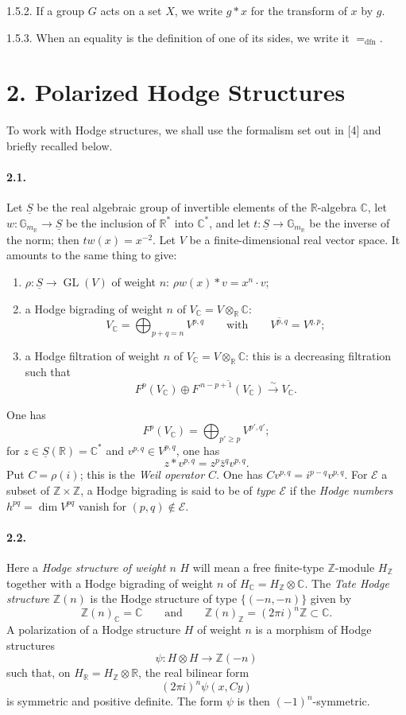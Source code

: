 \documentclass[10pt,leqno]{article}
\newcommand{\C}{\mathbb{C}}
\newcommand{\R}{\mathbb{R}}
\newcommand{\Z}{\mathbb{Z}}
\newcommand{\GL}{\operatorname{GL}}
\newcommand{\dfn}{\mathrm{dfn}}
\newcommand{\iso}{\xrightarrow{\sim}}
\begin{document}
1.5.2. If a group $G$ acts on a set $X$, we write $g*x$ for the transform of $x$ by $g$.

1.5.3. When an equality is the definition of one of its sides, we write it $=_{\dfn}$.

\section*{2. Polarized Hodge Structures}

To work with Hodge structures, we shall use the formalism set out in [4] and briefly recalled below.

\paragraph{2.1.} Let $\underline S$ be the real algebraic group of invertible elements of the $\R$-algebra $\C$, let $w:\mathbb G_{m_{\R}}\to\underline S$ be the inclusion of $\R^*$ into $\C^*$, and let $t:\underline S\to\mathbb G_{m_{\R}}$ be the inverse of the norm; then $t w(x)=x^{-2}$. Let $V$ be a finite-dimensional real vector space. It amounts to the same thing to give:
\begin{enumerate}[label=\alph*)]
\item $\rho:\underline S\to\GL(V)$ of weight $n$: $\rho w(x)*v=x^n\cdot v$;
\item a Hodge bigrading of weight $n$ of $V_\C=V\otimes_\R\C$:
\[
V_\C=\bigoplus_{p+q=n}V^{p,q}\qquad\text{with}\qquad \overline{V^{p,q}}=V^{q,p};
\]
\item a Hodge filtration of weight $n$ of $V_\C=V\otimes_\R\C$: this is a decreasing filtration such that
\[
F^p(V_\C)\oplus\overline{F^{\,n-p+1}(V_\C)}\iso V_\C.
\]
\end{enumerate}

\clearpage

One has
\[
F^p(V_\C)=\bigoplus_{p'\ge p}V^{p',q'};
\]
for $z\in\underline S(\R)=\C^*$ and $v^{p,q}\in V^{p,q}$, one has
\[
z*v^{p,q}=z^p\bar z^qv^{p,q}.
\]
Put $C=\rho(i)$; this is the \emph{Weil operator $C$}. One has $Cv^{p,q}=i^{p-q}v^{p,q}$. For $\mathscr E$ a subset of $\Z\times\Z$, a Hodge bigrading is said to be of \emph{type $\mathscr E$} if the \emph{Hodge numbers} $h^{pq}=\dim V^{pq}$ vanish for $(p,q)\notin\mathscr E$.

\paragraph{2.2.} Here a \emph{Hodge structure of weight $n$} $H$ will mean a free finite-type $\Z$-module $H_\Z$ together with a Hodge bigrading of weight $n$ of $H_\C=H_\Z\otimes\C$. The \emph{Tate Hodge structure} $\Z(n)$ is the Hodge structure of type $\{(-n,-n)\}$ given by
\[
\Z(n)_\C=\C
\qquad\text{and}\qquad
\Z(n)_\Z=(2\pi i)^n\Z\subset\C.
\]
A polarization of a Hodge structure $H$ of weight $n$ is a morphism of Hodge structures
\[
\psi:H\otimes H\longrightarrow\Z(-n)
\]
such that, on $H_\R=H_\Z\otimes\R$, the real bilinear form
\[
(2\pi i)^n\psi(x,Cy)
\]
is symmetric and positive definite. The form $\psi$ is then $(-1)^n$-symmetric.
\end{document}
